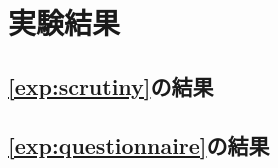 \section{実験結果}
	\subsection{\ref{exp:scrutiny}の結果}
	
	
	
	
	\subsection{\ref{exp:questionnaire}の結果}
	
	
	
	
